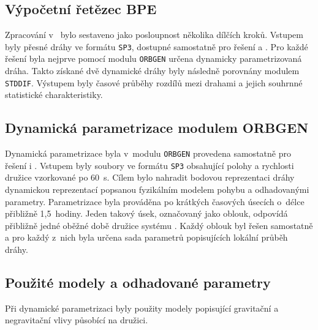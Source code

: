 \subsection{Výpočetní řetězec BPE}

Zpracování v~ bylo sestaveno jako posloupnost několika dílčích kroků. Vstupem byly přesné dráhy ve formátu \texttt{SP3}, dostupné samostatně pro řešení  a . Pro každé řešení byla nejprve pomocí modulu \texttt{ORBGEN} určena dynamicky parametrizovaná dráha. Takto získané dvě dynamické dráhy byly následně porovnány modulem \texttt{STDDIF}. Výstupem byly časové průběhy rozdílů mezi drahami a jejich souhrnné statistické charakteristiky.

\subsection{Dynamická parametrizace modulem ORBGEN}

Dynamická parametrizace byla v~modulu \texttt{ORBGEN} provedena samostatně pro \mbox{řešení}  i . Vstupem byly soubory ve formátu \texttt{SP3} obsahující polohy a rych\-losti družice vzorkované po 60~s. Cílem bylo nahradit bodovou reprezentaci dráhy \mbox{dynamickou} reprezentací popsanou fyzikálním modelem pohybu a odhadovanými parametry. Parame\-trizace byla prováděna po krátkých časových úsecích o~délce přibližně \mbox{1,5~hodiny}. Jeden takový úsek, označovaný jako oblouk, odpovídá přibližně jedné oběžné době družice systému . Každý oblouk byl řešen samostatně a pro každý z~nich byla určena sada parametrů popisujících lokální průběh dráhy.

\subsection{Použité modely a odhadované parametry}

Při dynamické parametrizaci byly použity modely popisující gravitační a negravitační vlivy působící na družici.

